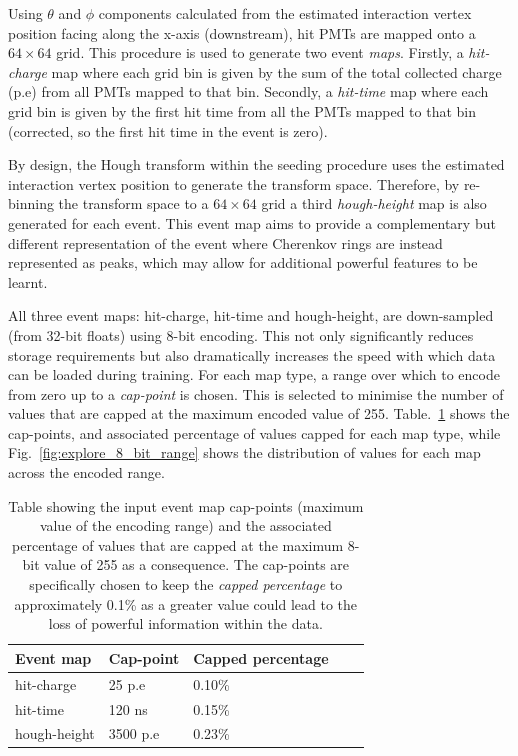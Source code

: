 Using $\theta$ and $\phi$ components calculated from the estimated interaction vertex position
facing along the x-axis (downstream), hit PMTs are mapped onto a $64 \times 64$ grid. This
procedure is used to generate two event \emph{maps}. Firstly, a \emph{hit-charge} map where each
grid bin is given by the sum of the total collected charge (p.e) from all PMTs mapped to that bin.
Secondly, a \emph{hit-time} map where each grid bin is given by the first hit time from all the
PMTs mapped to that bin (corrected, so the first hit time in the event is zero).

By design, the Hough transform within the seeding procedure uses the estimated interaction vertex
position to generate the transform space. Therefore, by re-binning the transform space to a $64
    \times 64$ grid a third \emph{hough-height} map is also generated for each event. This event map
aims to provide a complementary but different representation of the event where Cherenkov rings
are instead represented as peaks, which may allow for additional powerful features to be learnt.

All three event maps: hit-charge, hit-time and hough-height, are down-sampled (from 32-bit floats)
using 8-bit encoding. This not only significantly reduces storage requirements but also
dramatically increases the speed with which data can be loaded during training. For each map type,
a range over which to encode from zero up to a \emph{cap-point} is chosen. This is selected to
minimise the number of values that are capped at the maximum encoded value of 255.
Table.~\ref{tab:encoding} shows the cap-points, and associated percentage of values capped for
each map type, while Fig.~\ref{fig:explore_8_bit_range} shows the distribution of values for each
map across the encoded range.

\begin{table}
    \begin{tabular}{lllll}
        Event map    & Cap-point & Capped percentage \\
        \midrule
        hit-charge   & 25 p.e    & 0.10\%            \\
        hit-time     & 120 ns    & 0.15\%            \\
        hough-height & 3500 p.e  & 0.23\%            \\
    \end{tabular}
    \caption[Table of input event map 8-bit cap-points]
    {Table showing the input event map cap-points (maximum value of the encoding range) and the
        associated percentage of values that are capped at the maximum 8-bit value of 255 as a
        consequence. The cap-points are specifically chosen to keep the \emph{capped percentage}
        to approximately 0.1\% as a greater value could lead to the loss of powerful information
        within the data.}
    \label{tab:encoding}
\end{table}

